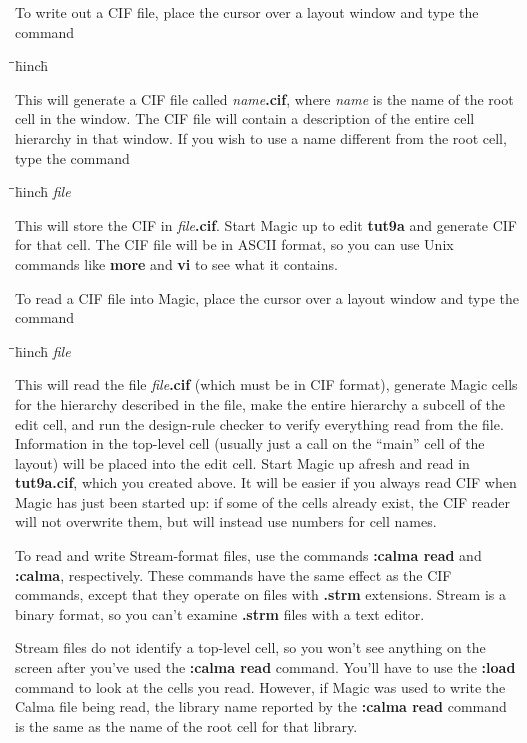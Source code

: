 \documentclass[letterpaper,twoside,12pt]{article}
\def\hinch{\hspace*{0.5in}}
\def\starti{\begin{center}\begin{tabbing}\hinch\=\hinch\=\hinch\=hinch\hinch\=\kill}
\def\endi{\end{tabbing}\end{center}}
\def\ii{\>\>\>}
\begin{document}
To write out a CIF file, place the cursor over a layout window
and type the command

\starti
   \ii {\bfseries :cif}
\endi

This will generate a CIF file called {\itshape name}{\bfseries .cif}, where
{\itshape name} is the name of the root cell in the window.  The CIF
file will contain a description of the entire cell
hierarchy in that window.  If you wish to use a name different
from the root cell, type the command

\starti
   \ii {\bfseries :cif write} {\itshape file}
\endi

This will store the CIF in {\itshape file}{\bfseries .cif}.  Start Magic up
to edit {\bfseries tut9a} and
generate CIF for that cell.  The CIF file
will be in ASCII format, so you can use Unix commands
like {\bfseries more} and {\bfseries vi} to see what it contains.

To read a CIF file into Magic, place the cursor over a layout window
and type the command

\starti
   \ii {\bfseries :cif read} {\itshape file}
\endi

This will read the file {\itshape file}{\bfseries .cif} (which must be in
CIF format), generate Magic cells for the hierarchy described
in the file, make the entire hierarchy a subcell of the
edit cell, and run the design-rule checker to verify everything
read from the file.  Information in the top-level cell (usually
just a call on the ``main'' cell of the layout) will be placed
into the edit cell.  Start Magic up afresh and read in {\bfseries tut9a.cif},
which you created above.  It will be easier if you always read
CIF when Magic has just been started up:  if some of the cells
already exist, the CIF reader will not overwrite them, but will
instead use numbers for cell names.

To read and write Stream-format files, use the commands
{\bfseries :calma read} and {\bfseries :calma}, respectively.  These commands
have the same effect as the CIF commands, except that they
operate on files with {\bfseries .strm} extensions.  Stream is a binary
format, so you can't examine {\bfseries .strm} files with a text editor.

Stream files do not identify a top-level cell, so you won't see
anything on the screen after you've used the {\bfseries :calma read}
command.  You'll have to use the {\bfseries :load} command to look at
the cells you read.  However, if Magic was used to write the
Calma file being read, the library name reported by the
{\bfseries :calma read} command is the same as the name of the
root cell for that library.
\end{document}
